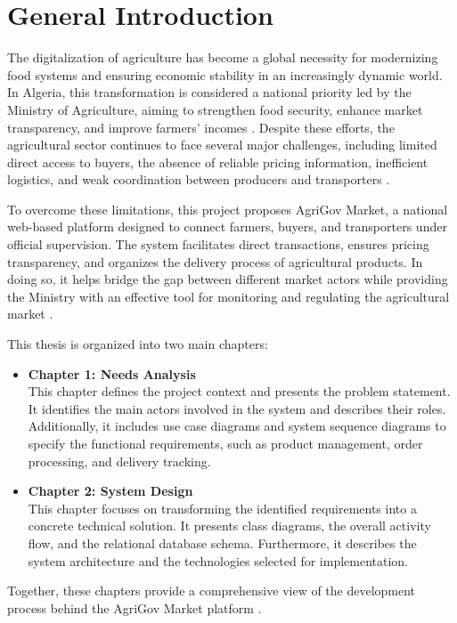 \chapter*{General Introduction}

The digitalization of agriculture has become a global necessity for modernizing food systems and ensuring economic stability in an increasingly dynamic world. In Algeria, this transformation is considered a national priority led by the Ministry of Agriculture, aiming to strengthen food security, enhance market transparency, and improve farmers’ incomes \cite{Chetibietal2026}. Despite these efforts, the agricultural sector continues to face several major challenges, including limited direct access to buyers, the absence of reliable pricing information, inefficient logistics, and weak coordination between producers and transporters \cite{Seltetal2026}.

To overcome these limitations, this project proposes AgriGov Market, a national web-based platform designed to connect farmers, buyers, and transporters under official supervision. The system facilitates direct transactions, ensures pricing transparency, and organizes the delivery process of agricultural products. In doing so, it helps bridge the gap between different market actors while providing the Ministry with an effective tool for monitoring and regulating the agricultural market \cite{Mohammadetal2025}.

This thesis is organized into two main chapters:

\begin{itemize}
	\item \textbf{Chapter 1: Needs Analysis} \\
	This chapter defines the project context and presents the problem statement. It identifies the main actors involved in the system and describes their roles. Additionally, it includes use case diagrams and system sequence diagrams to specify the functional requirements, such as product management, order processing, and delivery tracking.
	
	\item \textbf{Chapter 2: System Design} \\
	This chapter focuses on transforming the identified requirements into a concrete technical solution. It presents class diagrams, the overall activity flow, and the relational database schema. Furthermore, it describes the system architecture and the technologies selected for implementation.
\end{itemize}

Together, these chapters provide a comprehensive view of the development process behind the AgriGov Market platform \cite{benzadri2025}.